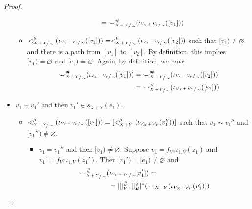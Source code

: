 \begin{proof}
\begin{itemize}
\begin{itemize}
\begin{itemize}
\begin{align*}
                                                                                                            &= {\smile}_{\sfrac{X+Y}{\sim}}^{{\#}}(\iota_{\sfrac{V_{X} + V_{Y}}{\sim}}([v_1]))
                    \end{align*}
                \end{itemize}
                \item $<_{\sfrac{X+Y}{\sim}}^{\mu}(\iota_{\sfrac{V_{X} + V_{Y}}{\sim}}([v_1])) = <_{\sfrac{X+Y}{\sim}}^{\mu}(\iota_{\sfrac{V_{X} + V_{Y}}{\sim}}([v_2]))$ such that $[v_2) \not = \varnothing$ and there is a path from $[v_1]$ to $[v_2]$. 
                By definition, this implies $[v_1) = \varnothing$ and $[e_1) = \varnothing$.
                Again, by definition, we have
                \begin{align*}
                    {\smile}_{\sfrac{X+Y}{\sim}}^{{\#}}(\iota_{\sfrac{V_{X} + V_{Y}}{\sim}}([v_1])) &= {\smile}_{\sfrac{X+Y}{\sim}}^{{\#}}(\iota_{\sfrac{V_{X} + V_{Y}}{\sim}}([v_2]))\\
                                                                                                    &= {\smile}_{\sfrac{X+Y}{\sim}}^{{\#}}(\iota_{\sfrac{E_{X} + E_{Y}}{\sim}}([e_1]))
                \end{align*}
                \end{itemize}
                \item $v_1 \sim v_1'$ and then $v_1' \in s_{X+Y}(e_1)$.
                \begin{itemize}
                    \item $<_{\sfrac{X+Y}{\sim}}^{\mu}(\iota_{\sfrac{V_{X} + V_{Y}}{\sim}}([v_1])) = [<_{X+Y}^{\mu}(\iota_{V_{X} + V_{Y}}(v_1''))]$ such that $v_1 \sim v_1''$ and $[v_1'') \not = \varnothing$.
                    \begin{itemize}
                        \item $v_1 = v_1''$ and then $[v_1) \not = \varnothing$.
                              Suppose $v_1 = f_{V};\iota_{1,V}(z_1)$ and $v_1' = f_{V};\iota_{1,V}(z_1')$. Then $[v_1') = [e_1) \not = \varnothing$ and 
                            \begin{align*}
                              \consistency_{\sfrac{X+Y}{\sim}}^{\hashtag}&(\iota_{\sfrac{V_{X} + V_{Y}}{\sim}}[v_1']) =\\
                              &\;= [[]_{V}^{\hashtag},[]_{E}^{\hashtag}]^{*}(\consistency_{X+Y}(\iota_{V_{X} + V_{Y}}(v_1')))\\

\end{align*}
\end{itemize}
\end{itemize}
\end{itemize}
\end{proof}
